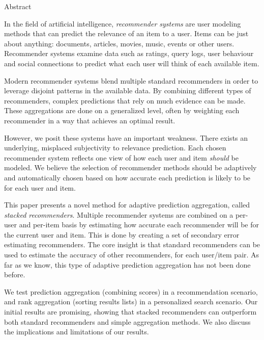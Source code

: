 \null\vspace{3em}
{
  \centering
  \normalfont
  \huge
  Abstract\\
}
\vspace{2em}

\noindent
In the field of artificial intelligence,
\emph{recommender systems} are user modeling methods
that can predict the relevance of an item to a user.
Items can be just about anything: 
documents, articles, movies, music, events or other users.
Recommender systems examine data such as ratings, query logs,
user behaviour and social connections to predict
what each user will think of each available item.

Modern recommender systems blend multiple standard recommenders
in order to leverage disjoint patterns in the available data.
By combining different types of recommenders,
complex predictions that rely on much evidence can be made.
These aggregations are done on a generalized level,
often by weighting each recommender in a way
that achieves an optimal result.

However, we posit these systems have an important weakness.
There exists an underlying, misplaced subjectivity to relevance prediction.
Each chosen recommender system reflects one view of 
how each user and item \emph{should} be modeled.
We believe the selection of recommender methods should 
be adaptively and automatically chosen based on
how accurate each prediction is likely to be for each user and item.

This paper presents a novel method for adaptive prediction aggregation,
called \emph{stacked recommenders}.
Multiple recommender systems are combined on a per-user and per-item basis
by estimating how accurate each recommender will be for the current user and item.
This is done by creating a set of secondary error estimating recommenders.
The core insight is that standard recommenders can be used
to estimate the accuracy of other recommenders, for each
user/item pair.
As far as we know, this type of adaptive prediction aggregation
has not been done before.

We test prediction aggregation (combining scores) in a
recommendation scenario,
and rank aggregation (sorting results lists) in a personalized search scenario.
Our initial results are promising, showing that stacked recommenders
can outperform both standard recommenders and simple aggregation methods.
We also discuss the implications and limitations of our results.

\clearpage
